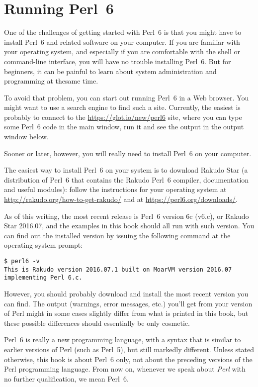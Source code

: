 \section{Running Perl~6}
\label{running_perl_6}

One of the challenges of getting started with Perl~6 is that you
might have to install Perl~6 and related software on your computer. 
If you are familiar with your operating system, and especially
if you are comfortable with the shell or command-line interface, 
you will have no trouble installing Perl~6.  But for beginners, 
it can be painful to learn about system administration and 
programming at thesame time.

To avoid that problem, you can start out running Perl~6 
in a Web browser. You might want to use a search engine 
to find such a site. Currently, the easiest is probably 
to connect to the \url{https://glot.io/new/perl6} site, 
where you can type some Perl~6 code in the main window, run 
it and see the output in the output window below.

Sooner or later, however, you will really need to install 
Perl~6 on your computer.

The easiest way to install Perl~6 on your system is to 
download Rakudo Star (a distribution of Perl~6 that contains 
the Rakudo Perl~6 compiler, documentation and useful modules): 
follow the instructions for your operating system at 
\url{http://rakudo.org/how-to-get-rakudo/} and at 
\url{https://perl6.org/downloads/}. 

As of this writing, the 
most recent release is Perl~6 version 6c (v6.c), or 
Rakudo Star 2016.07, and the examples in this book should 
all run with such version. You can find out the installed 
version by issuing the following command at the operating 
system prompt:
\begin{verbatim}
$ perl6 -v
This is Rakudo version 2016.07.1 built on MoarVM version 2016.07
implementing Perl 6.c.
\end{verbatim}

However, you should probably download and install the most recent 
version you can find. The output (warnings, error messages, 
etc.) you'll get from your version of Perl might in some 
cases slightly differ from what is printed in this book, 
but these possible differences should essentially be 
only cosmetic. 

Perl~6 is really a new programming language, 
with a syntax that is similar to earlier versions of 
Perl (such as Perl~5), but still markedly different. Unless 
stated otherwise, this book is about Perl~6 only, not about the 
preceding versions of the Perl programming language. From now on, 
whenever we speak about \emph{Perl} with no further qualification, 
we mean Perl~6.

